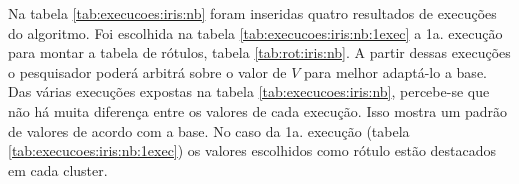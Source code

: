 \begin{table}[!h]
    \subfloat[3a. Execução]{ \label{tab:execucoes:iris:nb:3exec}
   \small\addtolength{\tabcolsep}{-2pt} 
     \begin{tabular}{|cl|c|c|c|c|}
        \hline \hline
         3a. Execução           &   & \multicolumn{4}{c|}{Atributos}                                               \\ \cline{3-6} 
       \multicolumn{1}{|l}{}                             &   & SL   & SW     & PL    & PW      \\ \hline
        \multicolumn{1}{|c|}{}                           & 1 & 80 & 68   & 100  & 100       \\ \cline{2-6} 
        \multicolumn{1}{|c|}{}                           & 2 & 72 & 74   & 84  &  84    \\ \cline{2-6} 
        \multicolumn{1}{|c|}{\multirow{-3}{*}{Clusters}} & 3 & 74 & 74   & 68  &   90   \\ \hline
      \end{tabular}
    }
    \hspace{1cm}
    
 \label{tab:execucoes:iris:nb}
\end{table}

Na tabela \ref{tab:execucoes:iris:nb} foram inseridas quatro resultados de execuções do algoritmo. Foi escolhida na tabela \ref{tab:execucoes:iris:nb:1exec} a 1a. execução para montar a tabela de rótulos, tabela \ref{tab:rot:iris:nb}. A partir dessas execuções o pesquisador poderá arbitrá sobre o valor de ${V}$ para melhor adaptá-lo a base. Das várias execuções expostas na tabela \ref{tab:execucoes:iris:nb}, percebe-se que não há muita diferença entre os valores de cada execução. Isso mostra um padrão de valores de acordo com a base. No caso da 1a. execução (tabela \ref{tab:execucoes:iris:nb:1exec}) os valores escolhidos como rótulo estão destacados em cada cluster.

